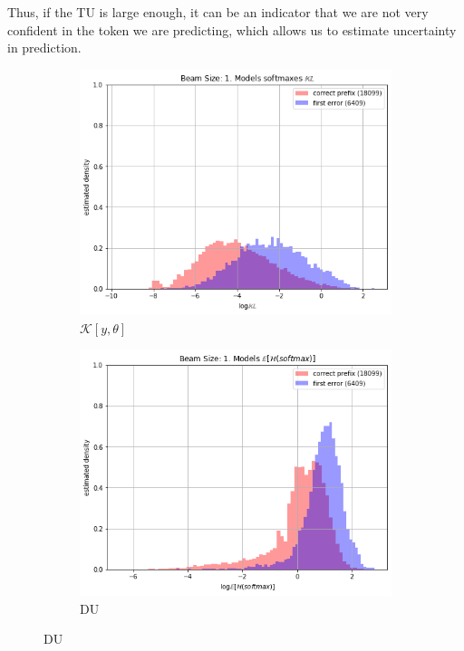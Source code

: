 \documentclass[a4paper,14pt]{extarticle}
\begin{document}
	Thus, if the TU is large enough, it can be an indicator that we are not very confident in the token we are predicting, which allows us to estimate uncertainty in prediction.
	
	\begin{figure}[t]
		\begin{subfigure}{.45\textwidth}
			\centering
			\includegraphics[width=1\textwidth]{images/ens_kl.png}
			\caption{$\mathcal{K}[y, \theta]$}
		\end{subfigure}
		\begin{subfigure}{.45\textwidth}
			\centering
			\includegraphics[width=1\textwidth]{images/ens_du.png}
			\caption{DU}
		\end{subfigure}
	\end{figure}
	
\end{document}

